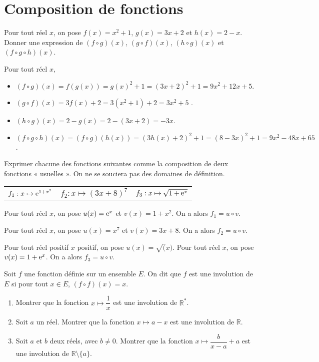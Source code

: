 \documentclass[11pt,fleqn, openany]{book} %
\begin{document}
\section*{Composition de fonctions}

\begin{exercise}Pour tout réel $x$, on pose $f(x)=x^2+1$, $g(x)=3x+2$ et $h(x)=2-x$.\\
\noindent Donner une expression de $(f \circ g) (x)$, $(g \circ f) (x)$, $(h \circ g) (x)$ et   $(f \circ g \circ h) (x)$.
\end{exercise}

\begin{solution}Pour tout réel $x$,
\begin{itemize}
\item  $(f \circ g) (x)=f(g(x))=g(x)^2+1=(3x+2)^2+1=9x^2+12x+5$.
\vskip5pt
\item   $(g \circ f) (x)=3f(x)+2=3(x^2+1)+2=3x^2+5$ .
\vskip5pt
\item  $(h \circ g) (x)=2-g(x)=2-(3x+2)=-3x$.
\vskip5pt
\item $(f \circ g \circ h) (x)=(f \circ g)(h(x))=(3h(x)+2)^2+1=(8-3x)^2+1=9x^2-48x+65$.
\end{itemize}
\end{solution}

\begin{exercise}Exprimer chacune des fonctions suivantes comme la composition de deux fonctions « usuelles ». On ne se souciera pas des domaines de définition.

\renewcommand{\arraystretch}{2}
\begin{tabularx}{\linewidth}{XXX}
 $f_1 : x \mapsto \mathrm{e}^{1+x^2}$&
 $f_2 : x \mapsto (3x+8)^7$&
  $f_3 : x \mapsto \sqrt{1+\mathrm{e}^x}$ \\
\end{tabularx}
\end{exercise}

\begin{solution}
Pour tout réel $x$, on pose $u(x)=\mathrm{e}^x$ et $v(x)=1+x^2$. On a alors $f_1=u \circ v$.

Pour tout réel $x$, on pose $u(x)=x^7$ et $v(x)=3x+8$. On a alors $f_2=u \circ v$.

Pour tout réel positif $x$ positif, on pose $u(x)=\sqrt(x)$. Pour tout réel $x$, on pose $v(x)=1+\mathrm{e}^x$. On a alors $f_3=u \circ v$.
\end{solution}

\begin{exercise}Soit $f$ une fonction définie sur un ensemble $E$. On dit que $f$ est une involution de $E$ si pour tout $x\in E$, $(f \circ f)(x)=x$.
\begin{enumerate}
\item Montrer que la fonction $x\mapsto \dfrac{1}{x}$ est une involution de $\mathbb{R}^*$.
\item Soit $a$ un réel. Montrer que la fonction $x\mapsto a-x$ est une involution de $\mathbb{R}$.
\item Soit $a$ et $b$ deux réels, avec $b\neq 0$. Montrer que la fonction $x\mapsto \dfrac{b}{x-a}+a$ est une involution de $\mathbb{R}\setminus \{a\}$.
\end{enumerate}\end{exercise}
\end{document}
